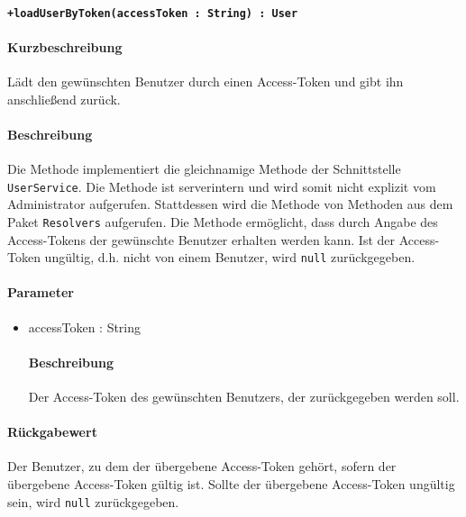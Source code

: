 \paragraph*{\texttt{+loadUserByToken(accessToken : String) : User}}%
\paragraph*{Kurzbeschreibung}
Lädt den gewünschten Benutzer durch einen Access-Token und gibt ihn anschließend zurück.
\paragraph*{Beschreibung}
Die Methode implementiert die gleichnamige Methode der Schnittstelle \texttt{UserService}.
Die Methode ist serverintern und wird somit nicht explizit vom Administrator aufgerufen.
Stattdessen wird die Methode von Methoden aus dem Paket \texttt{Resolvers} aufgerufen.
Die Methode ermöglicht, dass durch Angabe des Access-Tokens der gewünschte Benutzer erhalten werden kann. 
Ist der Access-Token ungültig, d.h. nicht von einem Benutzer, wird \texttt{null} zurückgegeben.
\paragraph*{Parameter}
\begin{itemize}
    \item accessToken : String
    		\paragraph*{Beschreibung}
    		Der Access-Token des gewünschten Benutzers, der zurückgegeben werden soll.
\end{itemize}
\paragraph*{Rückgabewert}
Der Benutzer, zu dem der übergebene Access-Token gehört, sofern der übergebene Access-Token gültig ist.
Sollte der übergebene Access-Token ungültig sein, wird \texttt{null} zurückgegeben.

